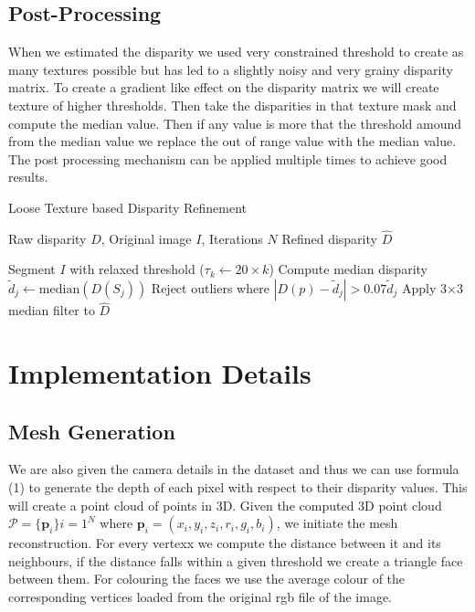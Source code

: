 \documentclass[12pt]{article}
\begin{document}
\begin{multicols}{2}
\subsection{Post-Processing}

When we estimated the disparity we used very constrained threshold to create as many textures possible but has led to a slightly noisy and very grainy disparity matrix.
To create a gradient like effect on the disparity matrix we will create texture of higher thresholds. Then take the disparities in that texture mask and compute the median value.
Then if any value is more that the threshold amound from the median value we replace the out of range value with the median value. The post processing mechanism can be 
applied multiple times to achieve good results.


\begin{algorithm}[H]
\caption{Loose Texture based Disparity Refinement}
\begin{algorithmic}[1]
\Require{} Raw disparity $D$, Original image $I$, Iterations $N$
\Ensure{} Refined disparity $\hat{D}$

    \State{} Segment $I$ with relaxed threshold ($\tau_k \gets 20 \times k$)
        \State{} Compute median disparity $\tilde{d}_j \gets \mathrm{median}(D(S_j))$
        \State{} Reject outliers where $|D(p) - \tilde{d}_j| > 0.07\tilde{d}_j$
    \EndFor{}
    \State{} Apply 3$\times$3 median filter to $\hat{D}$
\EndFor{}
\end{algorithmic}
\end{algorithm}


\section{Implementation Details}

\subsection{Mesh Generation}

We are also given the camera details in the dataset and thus we can use formula (1) to generate the depth of each pixel with respect to their disparity values. This will create a point
cloud of points in 3D. Given the computed 3D point cloud $\mathcal{P} = \{\mathbf{p}_i\} {i=1}^N$ where $\mathbf{p}_i = (x_i, y_i, z_i, r_i, g_i, b_i)$, we initiate the mesh reconstruction.
For every vertexx we compute the distance between it and its neighbours, if the distance falls within a given threshold we create a triangle face between them. For colouring the faces
we use the average colour of the corresponding vertices loaded from the original rgb file of the image.



\end{multicols}
\end{document}
